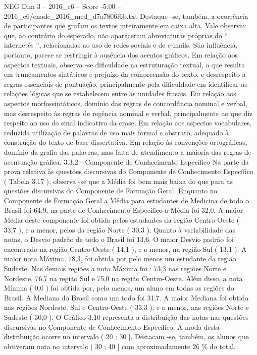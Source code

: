 \begin{textsample}{NEG Dim 3 – 2016\_c6 – Score -5.00 – 2016\_c6/enade\_2016\_med\_d7a7806f6b.txt}
Destaque -se, também, a ocorrência de participantes que grafam os textos inteiramente em caixa alta.
Vale observar que, ao contrário do esperado, não apareceram abreviaturas próprias do “ internetês ”, relacionadas ao uso de redes sociais e de e-mails.
Sua influência, portanto, parece se restringir à ausência dos acentos gráficos.
Em relação aos aspectos textuais, observa -se dificuldade na estruturação textual, o que resulta em truncamentos sintáticos e prejuízo da compreensão do texto, e desrespeito a regras essenciais de pontuação, principalmente pela dificuldade em identificar as relações lógicas que se estabelecem entre as unidades frasais.
Em relação aos aspectos morfossintáticos, domínio das regras de concordância nominal e verbal, mas desrespeito às regras de regência nominal e verbal, principalmente no que diz respeito ao uso do sinal indicativo da crase.
Em relação aos aspectos vocabulares, reduzida utilização de palavras de uso mais formal e abstrato, adequado à construção do texto de base dissertativa.
Em relação às convenções ortográficas, domínio da grafia das palavras, mas falta de atendimento à maioria das regras de acentuação gráfica. 3.3.2 - Componente de Conhecimento Específico Na parte da prova relativa às questões discursivas do Componente de Conhecimento Específico ( Tabela 3.17 ), observa -se que a Média foi bem mais baixa do que para as questões discursivas do Componente de Formação Geral.
Enquanto no Componente de Formação Geral a Média para estudantes de Medicina de todo o Brasil foi 64,9, na parte de Conhecimento Específico a Média foi 32,0.
A maior Média deste componente foi obtida pelos estudantes da região Centro-Oeste ( 33,7 ), e a menor, pelos da região Norte ( 30,3 ).
Quanto à variabilidade das notas, o Desvio padrão de todo o Brasil foi 13,6.
O maior Desvio padrão foi encontrado na região Centro-Oeste ( 14,1 ), e o menor, na região Sul ( 13,1 ).
A maior nota Máxima, 78,3, foi obtida por pelo menos um estudante da região Sudeste.
Nas demais regiões a nota Máxima foi : 73,3 nas regiões Norte e Nordeste, 76,7 na região Sul e 75,0 na região Centro-Oeste.
Além disso, a nota Mínima ( 0,0 ) foi obtida por, pelo menos, um aluno em todas as regiões do Brasil.
A Mediana do Brasil como um todo foi 31,7.
A maior Mediana foi obtida nas regiões Nordeste, Sul e Centro-Oeste ( 33,3 ), e a menor, nas regiões Norte e Sudeste ( 30,0 ).
O Gráfico 3.10 representa a distribuição das notas nas questões discursivas no Componente de Conhecimento Específico.
A moda desta distribuição ocorre no intervalo ( 20 ; 30 ].
Destacam -se, também, os alunos que obtiveram nota no intervalo [ 30 ; 40 ] com aproximadamente 26 \% do total.

\end{textsample}

